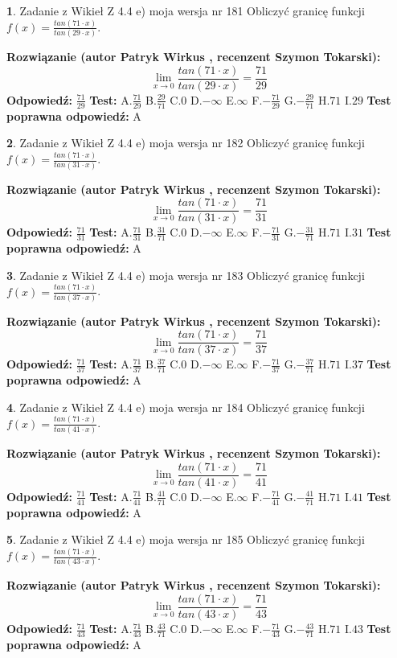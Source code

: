 \documentclass[12pt, a4paper]{article}
\theoremstyle{definition} %
\newtheorem{zad}{}
\newcommand{\zadStart}[1]{\begin{zad}#1\newline}
\newcommand{\zadStop}{\end{zad}}
\newcommand{\rozwStart}[2]{\noindent \textbf{Rozwiązanie (autor #1 , recenzent #2): }\newline}
\newcommand{\rozwStop}{\newline}
\newcommand{\odpStart}{\noindent \textbf{Odpowiedź:}\newline}
\newcommand{\odpStop}{\newline}
\newcommand{\testStart}{\noindent \textbf{Test:}\newline}
\newcommand{\testStop}{\newline}
\newcommand{\kluczStart}{\noindent \textbf{Test poprawna odpowiedź:}\newline}
\newcommand{\kluczStop}{\newline}
\begin{document}
\zadStart{Zadanie z Wikieł Z 4.4 e) moja wersja nr 181}
Obliczyć granicę funkcji $f(x)=\frac{tan(71\cdot x)}{tan(29\cdot x)}$.
\zadStop
\rozwStart{Patryk Wirkus}{Szymon Tokarski}
$$\lim\limits_{x\to 0}\frac{tan(71\cdot x)}{tan(29\cdot x)}=
\frac{71}{29}$$
\rozwStop
\odpStart
$\frac{71}{29}$
\odpStop
\testStart
A.$\frac{71}{29}$
B.$\frac{29}{71}$
C.$0$
D.$-\infty$
E.$\infty$
F.$-\frac{71}{29}$
G.$-\frac{29}{71}$
H.$71$
I.$29$
\testStop
\kluczStart
A
\kluczStop



\zadStart{Zadanie z Wikieł Z 4.4 e) moja wersja nr 182}
Obliczyć granicę funkcji $f(x)=\frac{tan(71\cdot x)}{tan(31\cdot x)}$.
\zadStop
\rozwStart{Patryk Wirkus}{Szymon Tokarski}
$$\lim\limits_{x\to 0}\frac{tan(71\cdot x)}{tan(31\cdot x)}=
\frac{71}{31}$$
\rozwStop
\odpStart
$\frac{71}{31}$
\odpStop
\testStart
A.$\frac{71}{31}$
B.$\frac{31}{71}$
C.$0$
D.$-\infty$
E.$\infty$
F.$-\frac{71}{31}$
G.$-\frac{31}{71}$
H.$71$
I.$31$
\testStop
\kluczStart
A
\kluczStop



\zadStart{Zadanie z Wikieł Z 4.4 e) moja wersja nr 183}
Obliczyć granicę funkcji $f(x)=\frac{tan(71\cdot x)}{tan(37\cdot x)}$.
\zadStop
\rozwStart{Patryk Wirkus}{Szymon Tokarski}
$$\lim\limits_{x\to 0}\frac{tan(71\cdot x)}{tan(37\cdot x)}=
\frac{71}{37}$$
\rozwStop
\odpStart
$\frac{71}{37}$
\odpStop
\testStart
A.$\frac{71}{37}$
B.$\frac{37}{71}$
C.$0$
D.$-\infty$
E.$\infty$
F.$-\frac{71}{37}$
G.$-\frac{37}{71}$
H.$71$
I.$37$
\testStop
\kluczStart
A
\kluczStop



\zadStart{Zadanie z Wikieł Z 4.4 e) moja wersja nr 184}
Obliczyć granicę funkcji $f(x)=\frac{tan(71\cdot x)}{tan(41\cdot x)}$.
\zadStop
\rozwStart{Patryk Wirkus}{Szymon Tokarski}
$$\lim\limits_{x\to 0}\frac{tan(71\cdot x)}{tan(41\cdot x)}=
\frac{71}{41}$$
\rozwStop
\odpStart
$\frac{71}{41}$
\odpStop
\testStart
A.$\frac{71}{41}$
B.$\frac{41}{71}$
C.$0$
D.$-\infty$
E.$\infty$
F.$-\frac{71}{41}$
G.$-\frac{41}{71}$
H.$71$
I.$41$
\testStop
\kluczStart
A
\kluczStop



\zadStart{Zadanie z Wikieł Z 4.4 e) moja wersja nr 185}
Obliczyć granicę funkcji $f(x)=\frac{tan(71\cdot x)}{tan(43\cdot x)}$.
\zadStop
\rozwStart{Patryk Wirkus}{Szymon Tokarski}
$$\lim\limits_{x\to 0}\frac{tan(71\cdot x)}{tan(43\cdot x)}=
\frac{71}{43}$$
\rozwStop
\odpStart
$\frac{71}{43}$
\odpStop
\testStart
A.$\frac{71}{43}$
B.$\frac{43}{71}$
C.$0$
D.$-\infty$
E.$\infty$
F.$-\frac{71}{43}$
G.$-\frac{43}{71}$
H.$71$
I.$43$
\testStop
\kluczStart
A
\kluczStop
\end{document}
